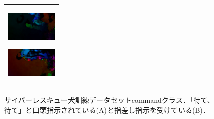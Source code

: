 \begin{figure}[H]
\begin{tabular}{l}
\begin{minipage}{0.165\hsize}
        \begin{center}
          \includegraphics[clip, width=2.5cm]{./Figures/optic_commandshoo4.eps}
          \hspace{0.1cm} { }
        \end{center}
      \end{minipage}
      \begin{minipage}{0.165\hsize}
        \begin{center}
          \includegraphics[clip, width=2.5cm]{./Figures/optic_commandshoo5.eps}
          \hspace{2.2cm} { }
        \end{center}
      \end{minipage}
    \end{tabular}
    \caption{サイバーレスキュー犬訓練データセットcommandクラス．「待て、待て」と口頭指示されている(A)と指差し指示を受けている(B)．}
    \label{command}
\end{figure}

